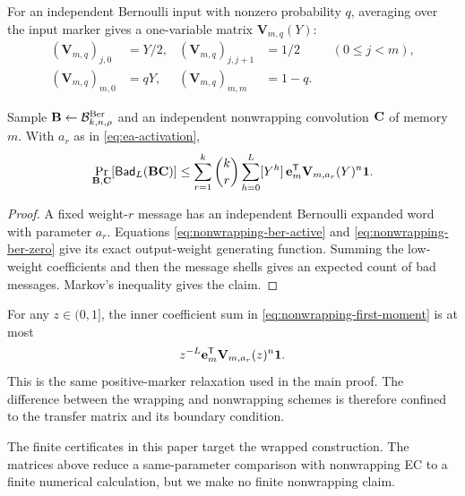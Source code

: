 For an independent Bernoulli input with nonzero probability $q$, averaging
over the input marker gives a one-variable matrix $\mathbf V_{m,q}(Y)$:
\begin{align}
 (\mathbf V_{m,q})_{j,0}&=Y/2,&
 (\mathbf V_{m,q})_{j,j+1}&=1/2 &&(0\leq j<m),
 \label{eq:nonwrapping-ber-active}\\
 (\mathbf V_{m,q})_{m,0}&=qY,&
 (\mathbf V_{m,q})_{m,m}&=1-q.
 \label{eq:nonwrapping-ber-zero}
\end{align}

\begin{theorem}
\label{thm:nonwrapping-first-moment}
Sample $\mathbf B\gets\mathcal B^{\mathrm{Ber}}_{k,n,\rho}$ and an independent
nonwrapping convolution $\mathbf C$ of memory $m$.  With $a_r$ as in
\eqref{eq:ea-activation},
\begin{equation}
 \Pr_{\mathbf B,\mathbf C}[\mathsf{Bad}_L(\mathbf B\mathbf C)]
 \leq
 \sum_{r=1}^{k}\binom kr\sum_{h=0}^{L}[Y^h]\,
 \mathbf e_m^{\mathsf T}\mathbf V_{m,a_r}(Y)^n\mathbf 1.
 \label{eq:nonwrapping-first-moment}
\end{equation}
\end{theorem}

\begin{proof}
A fixed weight-$r$ message has an independent Bernoulli expanded word with
parameter $a_r$.  Equations \eqref{eq:nonwrapping-ber-active} and
\eqref{eq:nonwrapping-ber-zero} give its exact output-weight generating
function.  Summing the low-weight coefficients and then the message shells
gives an expected count of bad messages.  Markov's inequality gives the
claim.
\end{proof}

For any $z\in(0,1]$, the inner coefficient sum in
\eqref{eq:nonwrapping-first-moment} is at most
\begin{equation}
 z^{-L}\mathbf e_m^{\mathsf T}\mathbf V_{m,a_r}(z)^n\mathbf 1.
 \label{eq:nonwrapping-marker}
\end{equation}
This is the same positive-marker relaxation used in the main proof.  The
difference between the wrapping and nonwrapping schemes is therefore confined
to the transfer matrix and its boundary condition.

The finite certificates in this paper target the wrapped construction.  The
matrices above reduce a same-parameter comparison with nonwrapping EC to a
finite numerical calculation, but we make no finite nonwrapping claim.
